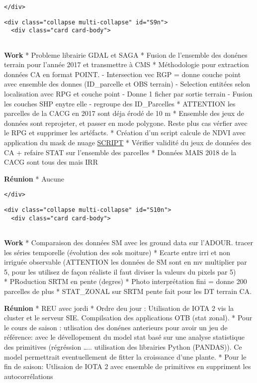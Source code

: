 \documentclass[11pt]{article}
\begin{document}
\begin{verbatim}
</div>
\end{verbatim}

\begin{verbatim}
<div class="collapse multi-collapse" id="S9n">
  <div class="card card-body">
      
\end{verbatim}

\textbf{Work} * Probleme librairie GDAL et SAGA * Fusion de l'ensemble
des donénes terrain pour l'année 2017 et transmettre à CMS *
Méthodologie pour extraction données CA en format POINT. - Intersection
vec RGP = donne couche point avec ensemble des donnes (ID\_parcelle et
OBS terrain) - Selection entitées selon localisation avec RPG et couche
point - Donne 1 ficher par sortie terrain - Fusion les couches SHP
enytre elle - regroupe des ID\_Parcelles * ATTENTION les parcelles de la
CACG en 2017 sont déja érodé de 10 m * Ensemble des jeux de données sont
reprojeter, et passer en mode polygone. Reste plus cas vérfier avec le
RPG et supprimer les artéfacts. * Création d'un script calcule de NDVI
avec application du mask de nuage
\href{https://github.com/pageotyann/code_python-/blob/master/Scrpit_NDVI2.py}{SCRIPT}
* Vérifier validité du jeux de données des CA + refaire STAT sur
l'ensemble des parcelles * Données MAIS 2018 de la CACG sont tous des
mais IRR

\textbf{Réunion} * Aucune

\begin{verbatim}
</div>
\end{verbatim}

\begin{verbatim}
<div class="collapse multi-collapse" id="S10n">
  <div class="card card-body">
     
\end{verbatim}

\textbf{Work} * Comparaison des données SM avec les ground data sur
l'ADOUR. tracer les séries temporelle (évolution des sols moiture) *
Ecarte entre irri et non irriguée observable (ATTENTION les données de
SM sont en mv multiplier par 5, pour les utilisez de façon réaliste il
faut diviser la valeurs du pixels par 5)\\
* PRoduction SRTM en pente (degres) * Photo interprétation fini = donne
200 parcelles de plus * STAT\_ZONAL sur SRTM pente fait pour les DT
terrain CA.

\textbf{Réunion} * REU avec jordi * Ordre deu jour : Utilisation de IOTA
2 vis la cluster et le serveur SIE. Compilsation des applications OTB
(stat zonal). * Pour le cours de saison : utlisation des donénes
anterieurs pour avoir un jeu de référence: avec le dévellopement du
model stat basé sur une analyse statistique des primitives (régréssion
\ldots{}.. utilisation des librairies Python (PANDAS)). Ce model
permettrait eventuellement de fitter la croissance d'une plante. * Pour
le fin de saison: Utlisaion de IOTA 2 avec ensemble de primitives en
suppriment les autocorrélations
\end{document}
